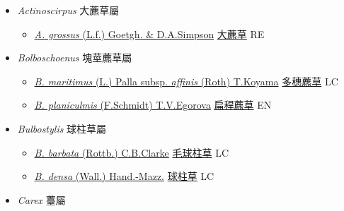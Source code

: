 
  \begin{itemize}
 \item[] \textit{Actinoscirpus} 大藨草屬
                    
  \begin{itemize}
        \item[] \href{http://www.theplantlist.org/tpl1.1/search?q=Actinoscirpus+grossus}{\textit{A. grossus} (L.f.) Goetgh. \& D.A.Simpson}   \href{\detokenize{http://taibnet.sinica.edu.tw/chi/taibnet_species_list.php?T2=大藨草&T2_new_value=true&fr=y}}{大藨草} RE
  \end{itemize}
 \item[] \textit{Bolboschoenus} 塊莖藨草屬
                    
  \begin{itemize}
        \item[] \href{http://www.theplantlist.org/tpl1.1/search?q=Bolboschoenus+maritimus+subsp.+affinis}{\textit{B. maritimus} (L.) Palla subsp. \textit{affinis} (Roth) T.Koyama}   \href{\detokenize{http://taibnet.sinica.edu.tw/chi/taibnet_species_list.php?T2=多穗藨草&T2_new_value=true&fr=y}}{多穗藨草} LC
        \item[] \href{http://www.theplantlist.org/tpl1.1/search?q=Bolboschoenus+planiculmis}{\textit{B. planiculmis} (F.Schmidt) T.V.Egorova}   \href{\detokenize{http://taibnet.sinica.edu.tw/chi/taibnet_species_list.php?T2=扁稈藨草&T2_new_value=true&fr=y}}{扁稈藨草} EN
  \end{itemize}
 \item[] \textit{Bulbostylis} 球柱草屬
                    
  \begin{itemize}
        \item[] \href{http://www.theplantlist.org/tpl1.1/search?q=Bulbostylis+barbata}{\textit{B. barbata} (Rottb.) C.B.Clarke}   \href{\detokenize{http://taibnet.sinica.edu.tw/chi/taibnet_species_list.php?T2=毛球柱草&T2_new_value=true&fr=y}}{毛球柱草} LC
        \item[] \href{http://www.theplantlist.org/tpl1.1/search?q=Bulbostylis+densa}{\textit{B. densa} (Wall.) Hand.-Mazz.}   \href{\detokenize{http://taibnet.sinica.edu.tw/chi/taibnet_species_list.php?T2=球柱草&T2_new_value=true&fr=y}}{球柱草} LC
  \end{itemize}
 \item[] \textit{Carex} 薹屬
                    

\end{itemize}
